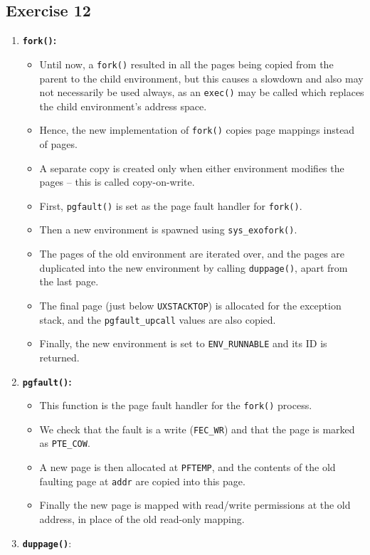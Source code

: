 \documentclass[]{article}
\begin{document}
\subsection{Exercise 12}

\begin{enumerate}
\def\labelenumi{\arabic{enumi}.}
\itemsep1pt\parskip0pt
\item
  \textbf{\texttt{fork()}:}

  \begin{itemize}
  \itemsep1pt\parskip0pt
  \item
    Until now, a \texttt{fork()} resulted in all the pages being copied
    from the parent to the child environment, but this causes a slowdown
    and also may not necessarily be used always, as an \texttt{exec()}
    may be called which replaces the child environment's address space.
  \item
    Hence, the new implementation of \texttt{fork()} copies page
    mappings instead of pages.
  \item
    A separate copy is created only when either environment modifies the
    pages -- this is called copy-on-write.
  \item
    First, \texttt{pgfault()} is set as the page fault handler for
    \texttt{fork()}.
  \item
    Then a new environment is spawned using \texttt{sys\_exofork()}.
  \item
    The pages of the old environment are iterated over, and the pages
    are duplicated into the new environment by calling
    \texttt{duppage()}, apart from the last page.
  \item
    The final page (just below \texttt{UXSTACKTOP}) is allocated for the
    exception stack, and the \texttt{pgfault\_upcall} values are also
    copied.
  \item
    Finally, the new environment is set to \texttt{ENV\_RUNNABLE} and
    its ID is returned.
  \end{itemize}
\item
  \textbf{\texttt{pgfault()}:}

  \begin{itemize}
  \itemsep1pt\parskip0pt
  \item
    This function is the page fault handler for the \texttt{fork()}
    process.
  \item
    We check that the fault is a write (\texttt{FEC\_WR}) and that the
    page is marked as \texttt{PTE\_COW}.
  \item
    A new page is then allocated at \texttt{PFTEMP}, and the contents of
    the old faulting page at \texttt{addr} are copied into this page.
  \item
    Finally the new page is mapped with read/write permissions at the
    old address, in place of the old read-only mapping.
  \end{itemize}
\item
  \textbf{\texttt{duppage()}}:


\end{enumerate}
\end{document}
